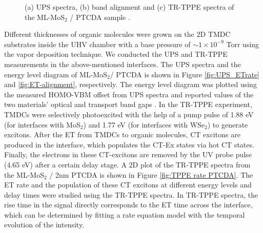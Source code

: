\documentclass[12pt]{article}
\begin{document}
\begin{figure}[H]
\caption{(a) UPS spectra, (b) band alignment and (c) TR-TPPE spectra of the ML-MoS$_2$ / PTCDA sample \cite{rijal2020collective}.}\label{fig:ET UPS TPPE}
\end{figure}

Different thicknesses of organic molecules were grown on the 2D TMDC substrates inside the UHV chamber with a base pressure of $\sim 1 \times 10^{-9}$ Torr using the vapor deposition technique. We conducted the UPS and TR-TPPE measurements in the above-mentioned interfaces. The UPS spectra and the energy level diagram of ML-MoS$_2$/ PTCDA  is shown in Figure \ref{fig:UPS_ETrate} and \ref{fig:ET-alignment}, respectively. The energy level diagram was plotted using the measured HOMO-VBM offset from UPS spectra and reported values of the two materials' optical and transport band gaps \cite{martinez2014imaging,forker2009optical,park2018direct}. In the TR-TPPE experiment, TMDCs were selectively photoexcited with the help of a pump pulse of 1.88 eV (for interfaces with MoS$_2$) and 1.77 eV (for interfaces with WSe$_2$) to generate excitons. After the ET from TMDCs to organic molecules, CT excitons are produced in the interface, which populates the CT-Ex states via hot CT states. Finally, the electrons in these CT-excitons are removed by the UV probe pulse (4.65 eV) after a certain delay stage. A 2D plot of the TR-TPPE spectra from the ML-MoS$_2$ / 2nm PTCDA is shown in Figure \ref{fig:TPPE rate PTCDA}. The ET rate and the population of these CT excitons at different energy levels and delay times were studied using the TR-TPPE spectra. In TR-TPPE spectra, the rise time in the signal directly corresponds to the ET time across the interface, which can be determined by fitting a rate equation model with the temporal evolution of the intensity.
\end{document}
